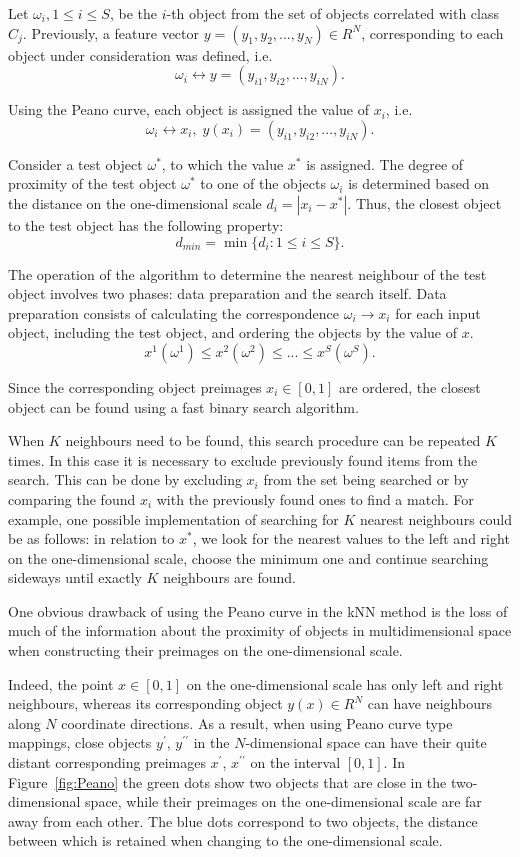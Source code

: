 \documentclass[entropy,article,submit,moreauthors,pdftex]{Definitions/mdpi}
\begin{document}
Let $\omega_i, 1 \leq i \leq S$, be the $i$-th object from the set of objects correlated with class $C_j$. Previously, a feature vector $y = (y_1, y_2, ..., y_N) \in R^N$, corresponding to each object under consideration was defined, i.e. 
\[
\omega_i \leftrightarrow y = (y_{i1}, y_{i2}, ..., y_{iN}).
\] 

Using the Peano curve, each object is assigned the value of $x_i$, i.e.
\[
\omega_i \leftrightarrow x_i, \; y(x_i) = (y_{i1}, y_{i2}, ..., y_{iN}).
\] 

Consider a test object $\omega^*$, to which the value $x^*$ is assigned. The degree of proximity of the test object $\omega^*$ to one of the objects $\omega_i$ is determined based on the distance on the one-dimensional scale $d_i = |x_i - x^* |$.
Thus, the closest object to the test object has the following property:
\[
d_{min} = \min \{ d_i: 1 \leq i \leq S \}.
\] 

The operation of the algorithm to determine the nearest neighbour of the test object involves two phases: data preparation and the search itself. Data preparation consists of calculating the correspondence $\omega_i \rightarrow x_i$ for each input object, including the test object, and ordering the objects by the value of $x$.
\[
x^1(\omega^1) \leq x^2(\omega^2) \leq ... \leq x^S(\omega^S).
\] 

Since the corresponding object preimages $x_i \in [0,1]$ are ordered, the closest object can be found using a fast binary search algorithm.

When $K$ neighbours need to be found, this search procedure can be repeated $K$ times. In this case it is necessary to exclude previously found items from the search. This can be done by excluding $x_i$ from the set being searched or by comparing the found $x_i$ with the previously found ones to find a match. For example, one possible implementation of searching for $K$ nearest neighbours could be as follows: in relation to $x^*$, we look for the nearest values to the left and right on the one-dimensional scale, choose the minimum one and continue searching sideways until exactly $K$ neighbours are found.

One obvious drawback of using the Peano curve in the kNN method is the loss of much of the information about the proximity of objects in multidimensional space when constructing their preimages on the one-dimensional scale. 

Indeed, the point $x \in [0,1]$ on the one-dimensional scale has only left and right neighbours, whereas its corresponding object $y(x) \in R^N$ can have neighbours along $N$ coordinate directions. As a result, when using Peano curve type mappings, close objects $y^\prime$, $y^{\prime\prime}$ in the $N$-dimensional space can have their quite distant corresponding preimages $x^\prime$, $x^{\prime\prime}$ on the interval $[0,1]$. In Figure~\ref{fig:Peano} the green dots show two objects that are close in the two-dimensional space, while their preimages on the one-dimensional scale are far away from each other. The blue dots correspond to two objects, the distance between which is retained when changing to the one-dimensional scale.
\end{document}
